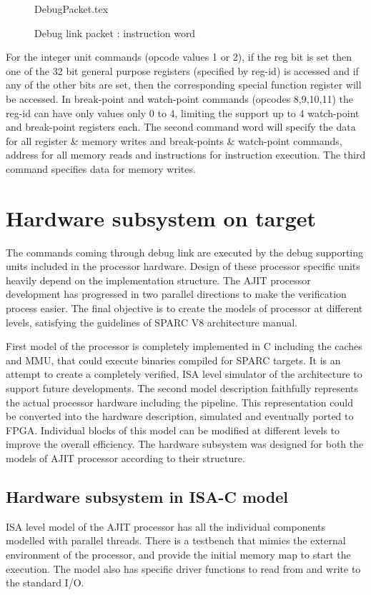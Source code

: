 \begin{figure}[h!]
	\centering
	\def\svgwidth{0.8\textwidth}
	{DebugPacket.tex}
	\caption{Debug link packet : instruction word}
	\label{DebugPacket}
\end{figure}

For the integer unit commands (opcode values 1 or 2), if the reg bit is set then one of the 32 bit general purpose registers (specified by reg-id) is accessed and if any of the other bits are set, then the corresponding special function register will be accessed. In break-point and watch-point commands (opcodes 8,9,10,11) the reg-id can have only values only 0 to 4, limiting the support up to 4 watch-point and break-point registers each. The second command word will specify the data for all register \& memory writes and break-points \& watch-point commands, address for all memory reads and instructions for instruction execution. The third command specifies data for memory writes.

\section{Hardware subsystem on target}
The commands coming through debug link are executed by the debug supporting units included in the processor hardware. Design of these processor specific units heavily depend on the implementation structure. The AJIT processor development has progressed in two parallel directions to make the verification process easier. The final objective is to create the models of processor at different levels, satisfying the guidelines of SPARC V8 architecture manual\cite{sparcV8}.

First model of the processor is completely implemented in C \cite{sarath} \cite{aneesh} including the caches and MMU, that could execute binaries compiled for SPARC targets. It is an attempt to create a completely verified, ISA level simulator of the architecture to support future developments. The second model description faithfully represents the actual processor hardware including the pipeline. This representation could be converted into the hardware description, simulated and eventually ported to FPGA. Individual blocks of this model can be modified at different levels to improve the overall efficiency. The hardware subsystem was designed for both the models of AJIT processor according to their structure.

\subsection{Hardware subsystem in ISA-C model}
ISA level model of the AJIT processor has all the individual components modelled with parallel threads. There is a testbench that mimics the external environment of the processor, and provide the initial memory map to start the execution. The model also has specific driver functions to read from and write to the standard I/O.

